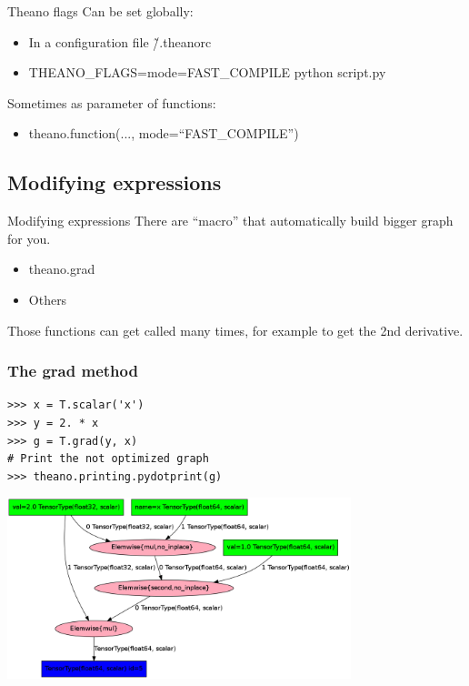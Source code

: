 \documentclass[utf8x,xcolor=pdftex,dvipsnames,table]{beamer}
\begin{document}
\begin{frame}{Theano flags}
  Can be set globally:
  \begin{itemize}
  \item In a configuration file \~/.theanorc
  \item THEANO\_FLAGS=mode=FAST\_COMPILE python script.py
  \end{itemize}

  Sometimes as parameter of functions:
  \begin{itemize}
  \item theano.function(..., mode=``FAST\_COMPILE'')
  \end{itemize}
\end{frame}

\subsection{Modifying expressions}
\begin{frame}{Modifying expressions}
  There are ``macro'' that automatically build bigger graph for you.
  \begin{itemize}
  \item theano.grad
  \item Others
  \end{itemize}
  Those functions can get called many times, for example to get the 2nd
  derivative.
\end{frame}

\begin{frame}[fragile]
  \frametitle{The grad method}

\begin{lstlisting}
>>> x = T.scalar('x')
>>> y = 2. * x
>>> g = T.grad(y, x)
# Print the not optimized graph
>>> theano.printing.pydotprint(g)
\end{lstlisting}
\includegraphics[width=0.75\textwidth]{pics/theano_grad.png}
\end{frame}
\end{document}
